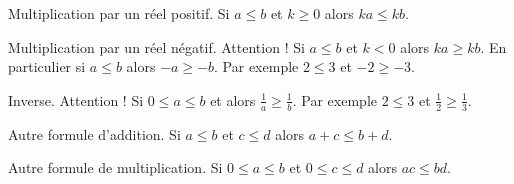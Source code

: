 \documentclass[10pt,class=article,crop=false]{standalone}
\begin{document}
\begin{multicols}{2}
{Multiplication par un réel positif.} 
Si $a \le b$ et $k \ge 0$ alors $ka \le kb$.

{Multiplication par un réel négatif.} 
Attention ! Si $a \le b$ et $k < 0$ alors $ka \ge kb$.
En particulier si $a \le b$ alors $-a \ge -b$. 
Par exemple $2 \le 3$ et $-2 \ge -3$.

{Inverse.}
Attention ! Si $0 \le a \le b$ et alors $\frac 1a \ge \frac 1b$. 
Par exemple $2 \le 3$ et $\frac 12 \ge \frac13$.

Autre formule d'addition.
Si $a \le b$ et $c \le d$ alors $a+c \le b+d$.
 
Autre formule de multiplication.
Si $0 \le a \le b$ et $0 \le c \le d$ alors $ac \le bd$.

\end{multicols}
\end{document}
